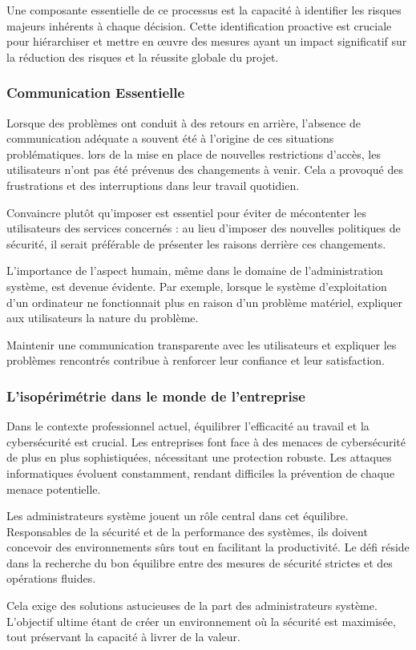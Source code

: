 Une composante essentielle de ce processus est la capacité à identifier les risques majeurs inhérents à chaque décision.
Cette identification proactive est cruciale pour hiérarchiser et mettre en œuvre des mesures ayant un impact significatif sur la réduction des risques et la réussite globale du projet.

\subsubsection{Communication Essentielle}
Lorsque des problèmes ont conduit à des retours en arrière, l'absence de communication adéquate a souvent été à l'origine de ces situations problématiques.
lors de la mise en place de nouvelles restrictions d'accès, les utilisateurs n'ont pas été prévenus des changements à venir.
Cela a provoqué des frustrations et des interruptions dans leur travail quotidien.

Convaincre plutôt qu'imposer est essentiel pour éviter de mécontenter les utilisateurs des services concernés : au lieu d'imposer des nouvelles politiques de sécurité, il serait préférable de présenter les raisons derrière ces changements.

L'importance de l'aspect humain, même dans le domaine de l'administration système, est devenue évidente.
Par exemple, lorsque le système d'exploitation d'un ordinateur ne fonctionnait plus en raison d'un problème matériel, expliquer aux utilisateurs la nature du problème.

Maintenir une communication transparente avec les utilisateurs et expliquer les problèmes rencontrés contribue à renforcer leur confiance et leur satisfaction.

\subsubsection{L'isopérimétrie dans le monde de l'entreprise}
Dans le contexte professionnel actuel, équilibrer l'efficacité au travail et la cybersécurité est crucial.
Les entreprises font face à des menaces de cybersécurité de plus en plus sophistiquées, nécessitant une protection robuste.
Les attaques informatiques évoluent constamment, rendant difficiles la prévention de chaque menace potentielle.

Les administrateurs système jouent un rôle central dans cet équilibre.
Responsables de la sécurité et de la performance des systèmes, ils doivent concevoir des environnements sûrs tout en facilitant la productivité.
Le défi réside dans la recherche du bon équilibre entre des mesures de sécurité strictes et des opérations fluides.

Cela exige des solutions astucieuses de la part des administrateurs système.
L'objectif ultime étant de créer un environnement où la sécurité est maximisée, tout préservant la capacité à livrer de la valeur.

